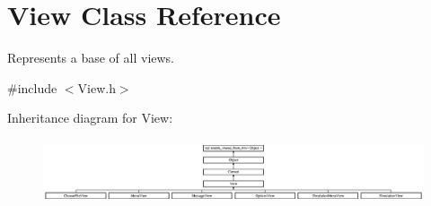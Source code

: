 \hypertarget{class_view}{}\section{View Class Reference}
\label{class_view}


Represents a base of all views.  




{\ttfamily \#include $<$View.\+h$>$}

Inheritance diagram for View\+:\begin{figure}[H]
\begin{center}
\leavevmode
\includegraphics[height=1.904762cm]{class_view}
\end{center}
\end{figure}
